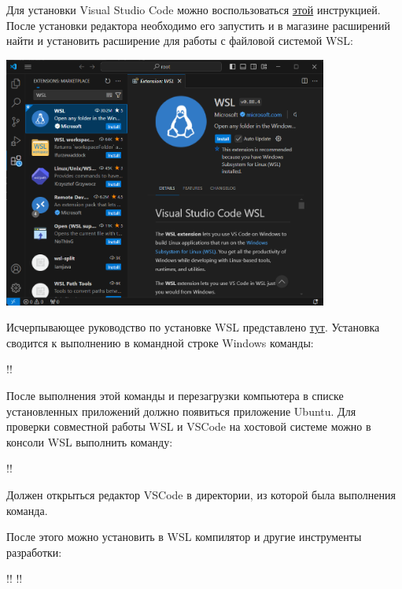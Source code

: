 \documentclass[14pt]{extarticle}
\begin{document}
Для установки Visual Studio Code можно воспользоваться
\href{https://code.visualstudio.com/docs/setup/windows#_installation}{этой}
инструкцией.
После установки редактора необходимо его запустить и в магазине расширений найти и установить
расширение для работы с файловой системой WSL:

\begin{center}
    \includegraphics[width=0.8\textwidth]{Homeworks/1-Hello-World/wsl-extension.png}
\end{center}

Исчерпывающее руководство по установке WSL представлено
\href{https://learn.microsoft.com/ru-ru/windows/wsl/setup/environment}{тут}.
Установка сводится к выполнению в командной строке Windows команды:

\begin{terminalwindow}
!!
\end{terminalwindow}

После выполнения этой команды и перезагрузки компьютера в списке установленных приложений
должно появиться приложение Ubuntu.
Для проверки совместной работы WSL и VSCode на хостовой системе можно в консоли WSL выполнить
команду:

\begin{terminalwindow}
!!
\end{terminalwindow}

Должен открыться редактор VSCode в директории, из которой была выполнения команда.

После этого можно установить в WSL компилятор и другие инструменты разработки:

\begin{terminalwindow}
!!
!!
\end{terminalwindow}
\end{document}
